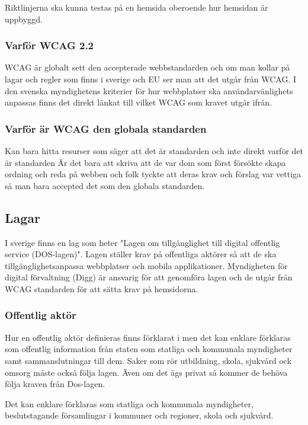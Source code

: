 \documentclass[11p]{article}
\begin{document}
    Riktlinjerna ska kunna testas på en hemsida oberoende hur hemsidan är uppbyggd.

    \subsubsection{Varför WCAG 2.2}
    WCAG är globalt sett den accepterade webbstandarden och om man kollar på lagar och regler som finns i sverige och EU ser man att det utgår från WCAG.
    I den svenska myndighetens kriterier för hur webbplatser ska användarvänlighets anpassas finns det direkt länkat till vilket WCAG som kravet utgår ifrån. \parencite{Utförande_av_Dos_lagen}


    \subsubsection{Varför är WCAG den globala standarden}
    Kan bara hitta resurser som säger att det är standarden och inte direkt varför det är standarden
    Är det bara att skriva att de var dom som först försökte skapa ordning och reda på webben och folk tyckte att deras krav och förslag var vettiga så man bara accepted det som den globala standarden.

    \subsection{Lagar}
    I sverige finns en lag som heter "Lagen om tillgänglighet till digital offentlig service (DOS-lagen)".\parencite{Dos-lagen}
    Lagen ställer krav på offentliga aktörer så att de ska tillgänglighetsanpassa webbplatser och mobila applikationer.
    Myndigheten för digital förvaltning (Digg) är ansvarig för att genomföra lagen och de utgår från WCAG standarden för att sätta krav på hemsidorna.

    \subsubsection{Offentlig aktör}
    Hur en offentlig aktör definieras finns förklarat i \textcite{Dos-lagen} men det kan enklare förklaras som offentlig information från staten som statliga och kommunala myndigheter samt sammanslutningar till dem.
    Saker som rör utbildning, skola, sjukvård ock omsorg måste också följa lagen.
    Även om det ägs privat så kommer de behöva följa kraven från Dos-lagen.

    Det kan enklare förklaras som statliga och kommunala myndigheter, beslutstagande församlingar i kommuner och regioner, skola och sjukvård.\parencite{Om_Dos-lage}
\end{document}
